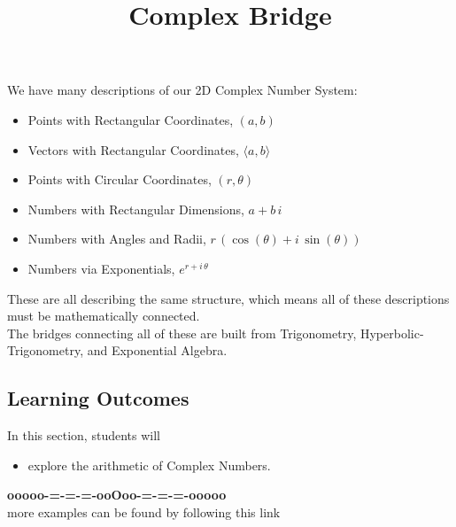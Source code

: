 \documentclass{ximera}
\title{Complex Bridge}
\begin{document}
\begin{abstract}
\end{abstract}
\maketitle




We have many descriptions of our 2D Complex Number System:

\begin{itemize}
\item Points with Rectangular Coordinates, $(a,b)$
\item Vectors with Rectangular Coordinates, $\langle a, b \rangle$
\item Points with Circular Coordinates, $(r,\theta)$
\item Numbers with Rectangular Dimensions, $a + b \, i$
\item Numbers with Angles and Radii, $r \, (\cos(\theta) + i \, \sin(\theta))$
\item Numbers via Exponentials, $e^{r + i \, \theta}$
\end{itemize}

These are all describing the same structure, which means all of these descriptions must be mathematically connected. \\


The bridges connecting all of these are built from Trigonometry, Hyperbolic-Trigonometry, and Exponential Algebra.





\subsection*{Learning Outcomes}

\begin{sectionOutcomes}
In this section, students will 

\begin{itemize}
\item explore the arithmetic of Complex Numbers.
\end{itemize}
\end{sectionOutcomes}













\begin{center}
\textbf{\textcolor{green!50!black}{ooooo-=-=-=-ooOoo-=-=-=-ooooo}} \\

more examples can be found by following this link\\ 

\end{center}
\end{document}
